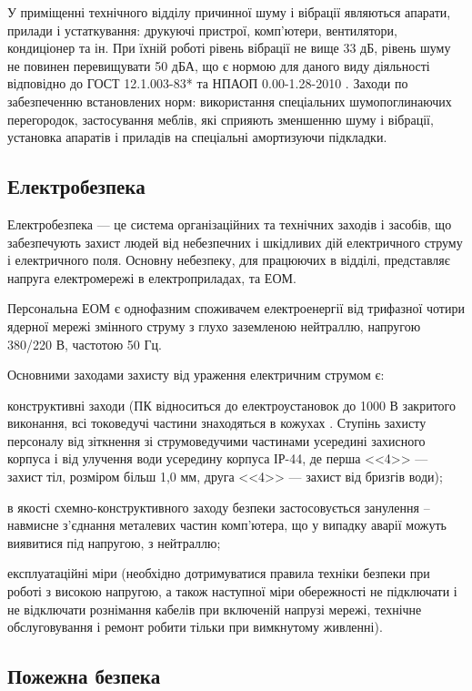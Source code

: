 У приміщенні технічного відділу причинної шуму і вібрації являються апарати, прилади і устаткування: друкуючі пристрої, комп'ютери, вентилятори, кондиціонер та ін. При їхній роботі рівень вібрації не вище 33 дБ, рівень шуму не повинен перевищувати 50 дБА, що є нормою для даного виду діяльності відповідно до ГОСТ 12.1.003-83* \cite{ber10} та НПАОП 0.00-1.28-2010 \cite{ber3}. Заходи по забезпеченню встановлених норм: використання спеціальних шумопоглинаючих перегородок, застосування меблів, які сприяють зменшенню шуму і вібрації, установка апаратів і приладів на спеціальні амортизуючи підкладки.

\subsection{Електробезпека}
Електробезпека --- це система організаційних та технічних заходів і засобів, що забезпечують захист людей від небезпечних і шкідливих дій електричного струму і електричного поля. Основну небезпеку, для працюючих в відділі, представляє напруга електромережі в електроприладах, та ЕОМ.

Персональна ЕОМ є однофазним споживачем електроенергії від трифазної чотири ядерної мережі змінного струму з глухо заземленою нейтраллю, напругою 380/220 В, частотою 50 Гц.

Основними заходами захисту від ураження електричним струмом є:
\begin{longEnumerate}
\item конструктивні заходи (ПК відноситься до електроустановок до 1000 В закритого виконання, всі токоведучі частини знаходяться в кожухах \cite{ber10}. Ступінь захисту персоналу від зіткнення зі струмоведучими частинами усередині захисного корпуса і від улучення води усередину корпуса ІР-44, де перша <<4>> --- захист тіл, розміром більш 1,0 мм, друга <<4>> --- захист від бризгів води);
\item в якості схемно-конструктивного заходу безпеки застосовується занулення – навмисне з’єднання металевих частин комп’ютера, що у випадку аварії можуть виявитися під напругою, з нейтраллю;
\item експлуатаційні міри (необхідно дотримуватися правила техніки безпеки при роботі з високою напругою, а також наступної міри обережності не підключати і не відключати рознімання кабелів при включеній напрузі мережі, технічне обслуговування і ремонт робити тільки при вимкнутому живленні).
\end{longEnumerate}

\subsection{Пожежна безпека}

